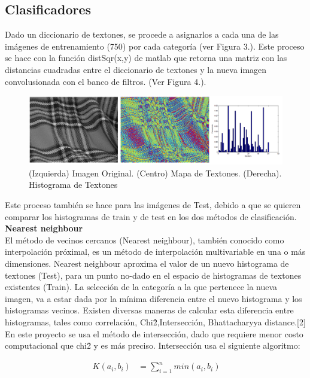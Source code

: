 \documentclass[10pt,twocolumn,letterpaper]{article}
\begin{document}
\subsection{Clasificadores}

Dado un diccionario de textones, se procede a asignarlos a cada una de las imágenes de entrenamiento (750) por cada categoría (ver Figura 3.). Este proceso se hace con la función distSqr(x,y) de matlab que retorna una matriz con las distancias cuadradas entre el diccionario de textones y la nueva imagen convolusionada con el banco de filtros. (Ver Figura 4.). 


\begin{figure}[!ht]

   \includegraphics[width=1\linewidth]{Ejemplo.png}
   \caption{(Izquierda) Imagen Original. (Centro) Mapa de Textones. (Derecha). Histograma de Textones} 
\end{figure}

Este proceso también se hace para las imágenes de Test, debido a que se quieren comparar los histogramas de train y de test en los dos métodos de clasificación.\\

\textbf{Nearest neighbour}\\

El método de vecinos cercanos (Nearest neighbour), también conocido como interpolación próximal, es un método de interpolación multivariable en una o más dimensiones. Nearest neighbour aproxima el valor de un nuevo histograma de textones (Test), para un punto no-dado en el espacio de histogramas de textones existentes (Train). La selección de la categoría a la que pertenece la nueva imagen, va a estar dada por la mínima diferencia entre el nuevo histograma y los histogramas vecinos. Existen diversas maneras de calcular esta diferencia entre histogramas, tales como\; correlación, Chi\^2,Intersección, Bhattacharyya distance.[2] 
En este proyecto se usa el método de intersección, dado que requiere menor costo computacional que chi\^2 y es más preciso. Intersección usa el siguiente algoritmo:

\begin{align*}
\ K(a_i,b_i) & = \sum_{i=1}^{n}min(a_i,b_i)\\ 
\end{align*}
\end{document}
